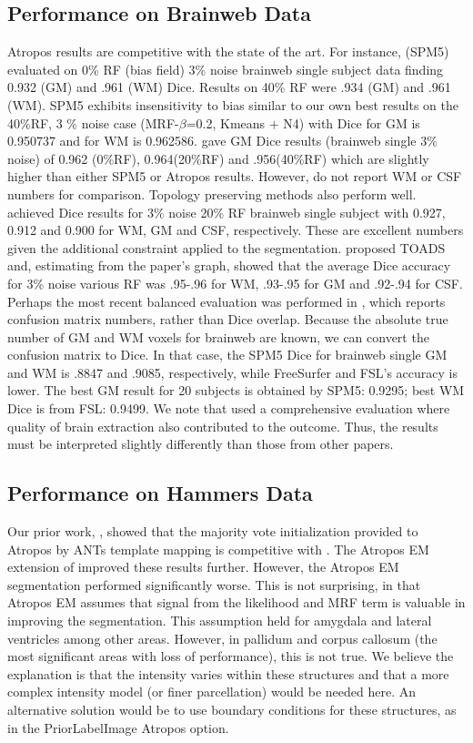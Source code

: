 \documentclass[11pt,english]{article}
\begin{document}
\subsection{Performance on Brainweb Data}
Atropos results are competitive with the state of the art.  For
instance, \cite{Ashburner2005} (SPM5) evaluated on 0\% RF (bias field) 3\%
noise brainweb single subject data finding 0.932 (GM) and .961 (WM)
Dice. Results on 40\% RF were .934 (GM) and .961 (WM). SPM5 exhibits
insensitivity to bias similar to our own best results on the 40\%RF, 3
\% noise case (MRF-$\beta$=0.2, Kmeans $+$ N4) with Dice for GM is
0.950737 and for WM is 0.962586.  \cite{Nakamura2009} gave GM Dice
results (brainweb single 3\% noise) of 0.962 (0\%RF), 0.964(20\%RF)
and .956(40\%RF) which are slightly higher than either SPM5 or Atropos
results.  However, \cite{Nakamura2009} do not report WM or CSF numbers
for comparison.  Topology preserving methods also perform well.
\cite{Shiee2010} achieved Dice results for 3\% noise 20\% RF brainweb
single subject with 0.927, 0.912 and 0.900 for WM, GM and CSF,
respectively.  These are excellent numbers given the additional
constraint applied to the segmentation.  
\cite{Bazin2007c} proposed TOADS and, estimating from the
paper's graph, showed that the average Dice accuracy for 3\% noise various RF was
.95-.96 for WM, .93-.95 for GM and .92-.94 for CSF.
Perhaps the most recent balanced evaluation was performed in
\citep{Klauschen2009}, which reports confusion matrix numbers, rather
than Dice overlap.  Because the absolute true number of GM and WM
voxels for brainweb are known, we can convert the confusion matrix to
Dice.  In that case, the SPM5 Dice for brainweb single GM and WM is .8847
and .9085, respectively, while FreeSurfer and FSL's accuracy is
lower. The best GM result for 20 subjects is obtained by SPM5: 0.9295;
best WM Dice is from FSL: 0.9499.  We note that \cite{Klauschen2009}
used a comprehensive evaluation where quality of brain extraction also
contributed to the outcome.  Thus, the results must be interpreted
slightly differently than those from other papers.  

\subsection{Performance on Hammers Data}
Our prior work, \citep{Avants2010b}, showed that the majority vote
initialization provided to Atropos by ANTs template mapping is
competitive with \cite{Heckemann2006}.  The Atropos EM extension of
improved these results further.  However, the Atropos EM segmentation
performed significantly worse.  This is not surprising, in that
Atropos EM assumes that signal from the likelihood and MRF term is
valuable in improving the segmentation.  This assumption held for
amygdala and lateral ventricles among other areas.  However, in
pallidum and corpus callosum (the most significant areas with loss of
performance), this is not true.  We believe the explanation is that
the intensity varies within these structures and that a more complex
intensity model (or finer parcellation) would be needed here.  An
alternative solution would be to use boundary conditions for these
structures, as in the PriorLabelImage Atropos option.
\end{document}
